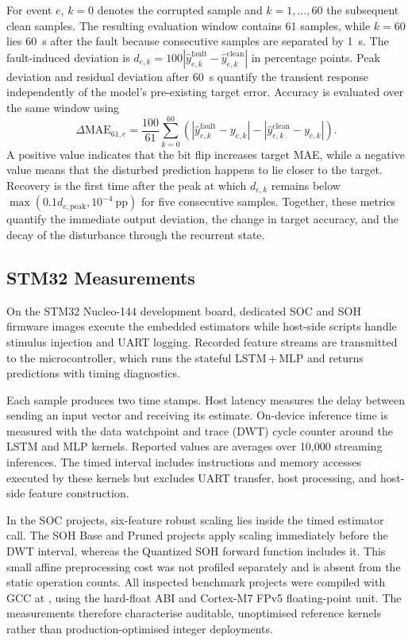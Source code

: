 \documentclass[review]{elsarticle}
\newcommand{\code}[1]{\path{#1}}
\begin{document}
For event $e$, $k=0$ denotes the corrupted sample and $k=1,\ldots,60$ the subsequent clean samples. The resulting evaluation window contains 61 samples, while $k=60$ lies 60~s after the fault because consecutive samples are separated by 1~s. The fault-induced deviation is $d_{e,k}=100|\hat{y}^{\mathrm{fault}}_{e,k}-\hat{y}^{\mathrm{clean}}_{e,k}|$ in percentage points. Peak deviation and residual deviation after 60~s quantify the transient response independently of the model's pre-existing target error. Accuracy is evaluated over the same window using
\begin{equation}
\Delta\mathrm{MAE}_{61,e}=\frac{100}{61}\sum_{k=0}^{60}\left(\left|\hat{y}^{\mathrm{fault}}_{e,k}-y_{e,k}\right|-\left|\hat{y}^{\mathrm{clean}}_{e,k}-y_{e,k}\right|\right).
\label{eq:fault_mae_change}
\end{equation}
A positive value indicates that the bit flip increases target MAE, while a negative value means that the disturbed prediction happens to lie closer to the target. Recovery is the first time after the peak at which $d_{e,k}$ remains below $\max(0.1d_{e,\mathrm{peak}},10^{-4}\ \mathrm{pp})$ for five consecutive samples. Together, these metrics quantify the immediate output deviation, the change in target accuracy, and the decay of the disturbance through the recurrent state.

\subsection{STM32 Measurements}
On the STM32 Nucleo-144 development board, dedicated SOC and SOH firmware images execute the embedded estimators while host-side scripts handle stimulus injection and UART logging. Recorded feature streams are transmitted to the microcontroller, which runs the stateful LSTM\,+\,MLP and returns predictions with timing diagnostics.

Each sample produces two time stamps. Host latency measures the delay between sending an input vector and receiving its estimate. On-device inference time is measured with the data watchpoint and trace (DWT) cycle counter around the LSTM and MLP kernels. Reported values are averages over 10,000 streaming inferences. The timed interval includes instructions and memory accesses executed by these kernels but excludes UART transfer, host processing, and host-side feature construction.

In the SOC projects, six-feature robust scaling lies inside the timed estimator call. The SOH Base and Pruned projects apply scaling immediately before the DWT interval, whereas the Quantized SOH forward function includes it. This small affine preprocessing cost was not profiled separately and is absent from the static operation counts. All inspected benchmark projects were compiled with GCC at \code{-O0}, using the hard-float ABI and Cortex-M7 FPv5 floating-point unit. The measurements therefore characterise auditable, unoptimised reference kernels rather than production-optimised integer deployments.
\end{document}

